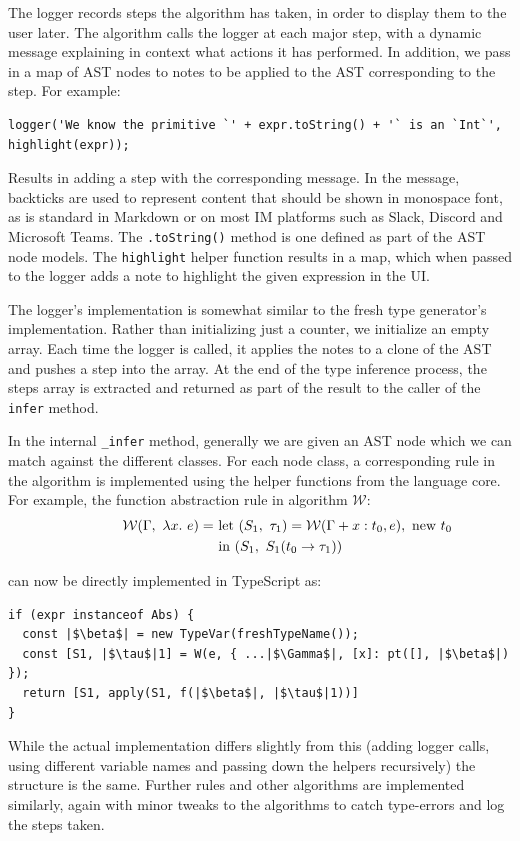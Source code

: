\documentclass[a4paper,fleqn,oneside,12pt]{report}
\newcommand{\W}{$\mathcal{W}$}
\begin{document}
The logger records steps the algorithm has taken, in order to display them to the user later. The algorithm calls the logger at each major step, with a dynamic message explaining in context what actions it has performed. In addition, we pass in a map of AST nodes to notes to be applied to the AST corresponding to the step. For example:

\begin{verbatim}
logger('We know the primitive `' + expr.toString() + '` is an `Int`', highlight(expr));
\end{verbatim}

Results in adding a step with the corresponding message. In the message, backticks are used to represent content that should be shown in monospace font, as is standard in Markdown or on most IM platforms such as Slack, Discord and Microsoft Teams. The \texttt{.toString()} method is one defined as part of the AST node models. The \texttt{highlight} helper function results in a map, which when passed to the logger adds a note to highlight the given expression in the UI.

The logger's implementation is somewhat similar to the fresh type generator's implementation. Rather than initializing just a counter, we initialize an empty array. Each time the logger is called, it applies the notes to a clone of the AST and pushes a step into the array. At the end of the type inference process, the steps array is extracted and returned as part of the result to the caller of the \texttt{infer} method.

In the internal \texttt{_infer} method, generally we are given an AST node which we can match against the different classes. For each node class, a corresponding rule in the algorithm is implemented using the helper functions from the language core. For example, the function abstraction rule in algorithm \W:
\begin{align*}
\hspace{1.4cm}\mathcal{W}(\Gamma,\ \lambda x.\ e  ) =\ & \textrm{let}\ (S_1,\ \tau_1) = \mathcal{W}(\Gamma + x : t_0, e),\ \textrm{new}\ t_0\\
& \textrm{in}\ (S_1,\ S_1(t_0 \rightarrow \tau_1))
\end{align*}

can now be directly implemented in TypeScript as:

\begin{verbatim}
if (expr instanceof Abs) {
  const |$\beta$| = new TypeVar(freshTypeName());
  const [S1, |$\tau$|1] = W(e, { ...|$\Gamma$|, [x]: pt([], |$\beta$|) });
  return [S1, apply(S1, f(|$\beta$|, |$\tau$|1))]
}
\end{verbatim}
While the actual implementation differs slightly from this (adding logger calls, using different variable names and passing down the helpers recursively) the structure is the same. Further rules and other algorithms are implemented similarly, again with minor tweaks to the algorithms to catch type-errors and log the steps taken.
\end{document}
